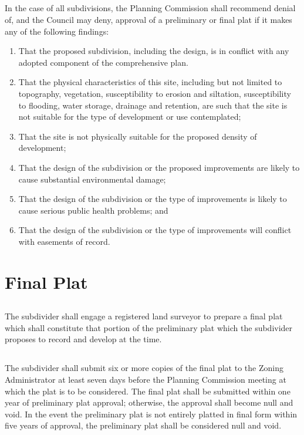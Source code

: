 \subsection{}
In the case of all subdivisions, the Planning Commission shall recommend denial of, and the Council may deny, approval of a preliminary or final plat if it makes any of the following findings:
\begin{enumerate}[{\indent}1)]
    \item That the proposed subdivision, including the design, is in conflict with any adopted component of the comprehensive plan.
    \item That the physical characteristics of this site, including but not limited to topography, vegetation, susceptibility to erosion and siltation, susceptibility to flooding, water storage, drainage and retention, are such that the site is not suitable for the type of development or use contemplated;
    \item That the site is not physically suitable for the proposed density of development;
    \item That the design of the subdivision or the proposed improvements are likely to cause substantial environmental damage;
    \item That the design of the subdivision or the type of improvements is likely to cause serious public health problems; and
    \item That the design of the subdivision or the type of improvements will conflict with easements of record.
\end{enumerate}

\section{Final Plat}
\subsection{}
The subdivider shall engage a registered land surveyor to prepare a final plat which shall constitute that portion of the preliminary plat which the subdivider proposes to record and develop at the time.
\subsection{}
The subdivider shall submit six or more copies of the final plat to the Zoning Administrator at least seven days before the Planning Commission meeting at which the plat is to be considered.  The final plat shall be submitted within one year of preliminary plat approval; otherwise, the approval shall become null and void.  In the event the preliminary plat is not entirely platted in final form within five years of approval, the preliminary plat shall be considered null and void.
